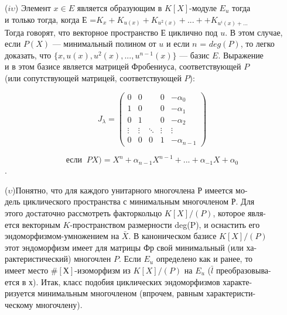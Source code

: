 \medskip

($\mathit{i}\upsilon $) Элемент $x\in E$ является образующим в $K[X]$-модуле $E_u$ тогда\\
и только тогда, когда Е =$ K_x + K_{u(x)} + K_{u^2(x)}+...++ K_{u^i(x)+...} $\\ 
Тогда говорят, что векторное пространство $Е$ циклично под $u$. В этом 
случае, если $P(X)$ — минимальный полином от $u$ и если $n$ = $deg(P)$, то 
легко доказать, что $\{x, u(x), u^2(x),..., u^{n-1}(x)\}$ — базис $E$. Выражение\\
и в этом базисе является матрицей Фробениуса, соответствующей $P$ \\
(или сопутствующей матрицей, соответствующей $P$): 

\medskip

$$J_{\lambda} = \begin{pmatrix}
0 & 0 & \; & 0 & -\alpha_0 \\
1 & 0 & \; & 0 & -\alpha_1 \\
0 & 1 & \; & 0 & -\alpha_2 \\
\vdots & \vdots & \ddots & \vdots & \vdots \\
0 & 0 & 0 & 1 & -\alpha_{n-1}
\end{pmatrix}
$$


$$\text{если} \;\;PX) = X^n+\alpha_{n-1}X^{n-1}+... +\alpha_{-1}X+\alpha_0$$.

\pagebreak

($\upsilon$)Понятно, что для каждого унитарного многочлена Р имеется 
мо-\\дель циклического пространства с минимальным многочленом Р. Для\\ 
этого достаточно рассмотреть факторкольцо $K[X]/(P)$, которое 
явля-\\ется векторным $\mathit{K}$-пространством размерности deg(P), и оснастить его \\эндоморфизмом-умножением на $\bar{X}$. В каноническом базисе $K[X]/(P)$\\
этот эндоморфизм имеет для матрицы Фр свой минимальный (или 
ха-\\рактеристический) многочлен $P$. Если $E_u$ определено как и ранее, то\\ 
имеет место $\# [Х]$-изоморфизм из $K[X]/(P)$ на $E_u$ ($\bar{l}$ 
преобразовыва-\\ется в х). Итак, класс подобия циклических эндоморфизмов 
характе-\\ризуется минимальным многочленом (впрочем, равным 
характеристи-\\ческому многочлену).

